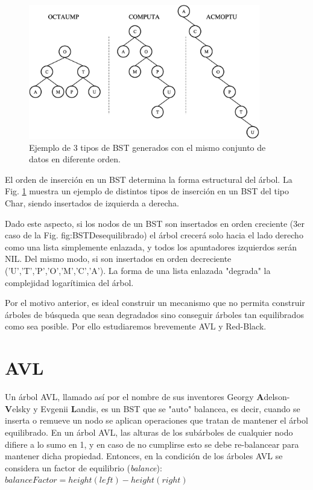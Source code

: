 \begin{figure}[htpb!]
  \begin{center}
    \includegraphics[width=0.9\textwidth]{images/BSTDesequilibrado.eps}
  \end{center}
  \caption{Ejemplo de 3 tipos de BST generados con el mismo conjunto de datos en diferente orden.}
  \label{fig:BSTDesequilibrado}
\end{figure}

El orden de inserción en un BST determina la forma estructural del árbol. La Fig. \ref{fig:BSTDesequilibrado} muestra un ejemplo de distintos tipos de inserción en un BST del tipo Char, siendo insertados de izquierda a derecha.

Dado este aspecto, si los nodos de un BST son insertados en orden creciente (3er caso de la Fig. {fig:BSTDesequilibrado}) el árbol crecerá solo hacia el lado derecho como una lista simplemente enlazada, y todos los apuntadores izquierdos serán NIL. Del mismo modo, si son insertados en orden decreciente ('U','T','P','O','M','C','A'). La forma de una lista enlazada "degrada" la complejidad logarítimica del árbol.

Por el motivo anterior, es ideal construir un mecanismo que no permita construir árboles de búsqueda que sean degradados sino conseguir árboles tan equilibrados como sea posible. Por ello estudiaremos brevemente AVL y Red-Black.

\section{AVL}

Un árbol AVL, llamado así por el nombre de sus inventores Georgy \textbf{A}delson-\textbf{V}elsky y Evgenii \textbf{L}andis, es un BST que se "auto" balancea, es decir, cuando se inserta o remueve un nodo se aplican operaciones que tratan de mantener el árbol equilibrado. En un árbol AVL, las alturas de los subárboles de cualquier nodo difiere a lo sumo en 1, y en caso de no cumplirse esto se debe re-balancear para mantener dicha propiedad. Entonces, en la condición de los árboles AVL se considera un factor de equilibrio (\textit{balance}):
$balanceFactor = height(left) - height(right)$

